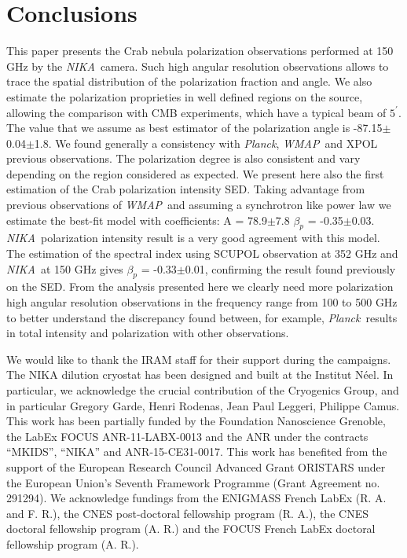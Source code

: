 \documentclass[twocolumn,traditabstract]{aa}
\def\NIKA{\textit{NIKA}}
\def\Planck{\textit{Planck}}
\def\WMAP{\textit{WMAP}}
\begin{document}
\section{Conclusions}\label{sec:conclusions}
This paper presents the Crab nebula polarization observations performed at 150 GHz by the \NIKA\ camera. Such high angular resolution observations allows to trace the spatial distribution of the polarization fraction and angle. 
We also estimate the polarization proprieties in well defined regions on the source, allowing the comparison with CMB experiments, which have a typical beam of $5^\prime$. The value that we assume as best estimator of the polarization angle is -87.15$\pm$0.04$\pm$1.8. We found generally a consistency with \Planck, \WMAP\ and XPOL previous observations. The polarization degree is also consistent and vary depending on the region considered as expected. 
We present here also the first estimation of the Crab polarization intensity SED. Taking advantage from previous observations of \WMAP\ and assuming a synchrotron like power law we estimate the best-fit model with coefficients: A = 78.9$\pm$7.8  $\beta_p$ = -0.35$\pm$0.03. \NIKA\ polarization intensity result is a very good agreement with this model. The estimation of the spectral index using SCUPOL observation at 352 GHz and \NIKA\ at 150 GHz gives $\beta_p$ = -0.33$\pm$0.01, confirming the result found previously on the SED.
From the analysis presented here we clearly need more polarization high angular resolution observations in the frequency range from 100 to 500 GHz to better understand the discrepancy found between, for example, \Planck\ results in total intensity and polarization with other observations.
\vspace{0.2cm}
 \begin{acknowledgements}
We would like to thank the IRAM staff for their support during the campaigns. 
The NIKA dilution cryostat has been designed and built at the Institut N\'eel. 
In particular, we acknowledge the crucial contribution of the Cryogenics Group, and 
in particular Gregory Garde, Henri Rodenas, Jean Paul Leggeri, Philippe Camus. 
This work has been partially funded by the Foundation Nanoscience Grenoble, the LabEx FOCUS ANR-11-LABX-0013 and 
the ANR under the contracts ``MKIDS'', ``NIKA'' and ANR-15-CE31-0017. 
This work has benefited from the support of the European Research Council Advanced Grant ORISTARS 
under the European Union's Seventh Framework Programme (Grant Agreement no. 291294).
We acknowledge fundings from the ENIGMASS French LabEx (R. A. and F. R.), 
the CNES post-doctoral fellowship program (R. A.),  the CNES doctoral fellowship program (A. R.) and 
the FOCUS French LabEx doctoral fellowship program (A. R.).
\end{acknowledgements}



\end{document}
